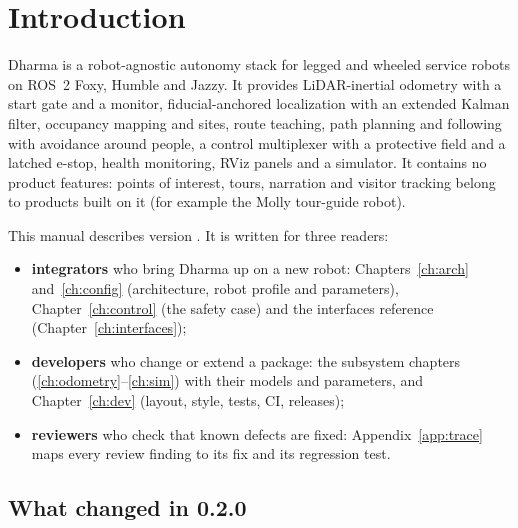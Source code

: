 \chapter{Introduction}
\label{ch:intro}

Dharma is a robot-agnostic autonomy stack for legged and wheeled service robots on ROS~2
Foxy, Humble and Jazzy. It provides LiDAR-inertial odometry with a start gate and a monitor,
fiducial-anchored localization with an extended Kalman filter, occupancy mapping and sites,
route teaching, path planning and following with avoidance around people, a control
multiplexer with a protective field and a latched e-stop, health monitoring, RViz panels and a
simulator. It contains no product features: points of interest, tours, narration and visitor
tracking belong to products built on it (for example the Molly tour-guide robot).

This manual describes version \DharmaVersion. It is written for three readers:
\begin{itemize}
  \item \textbf{integrators} who bring Dharma up on a new robot: Chapters~\ref{ch:arch}
    and~\ref{ch:config} (architecture, robot profile and parameters), Chapter~\ref{ch:control}
    (the safety case) and the interfaces reference (Chapter~\ref{ch:interfaces});
  \item \textbf{developers} who change or extend a package: the subsystem chapters
    (\ref{ch:odometry}--\ref{ch:sim}) with their models and parameters, and
    Chapter~\ref{ch:dev} (layout, style, tests, CI, releases);
  \item \textbf{reviewers} who check that known defects are fixed: Appendix~\ref{app:trace}
    maps every review finding to its fix and its regression test.
\end{itemize}

\section{What changed in 0.2.0}

